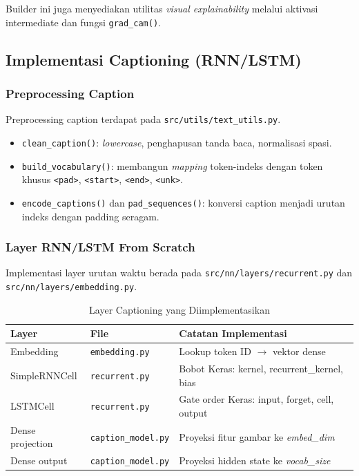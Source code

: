 Builder ini juga menyediakan utilitas \textit{visual explainability} melalui aktivasi intermediate dan fungsi \texttt{grad\_cam()}.

\subsection{Implementasi Captioning (RNN/LSTM)}

\subsubsection{Preprocessing Caption}
Preprocessing caption terdapat pada \texttt{src/utils/text\_utils.py}.

\begin{itemize}
    \item \texttt{clean\_caption()}: \textit{lowercase}, penghapusan tanda baca, normalisasi spasi.
    \item \texttt{build\_vocabulary()}: membangun \textit{mapping} token-indeks dengan token khusus \texttt{<pad>}, \texttt{<start>}, \texttt{<end>}, \texttt{<unk>}.
    \item \texttt{encode\_captions()} dan \texttt{pad\_sequences()}: konversi caption menjadi urutan indeks dengan padding seragam.
\end{itemize}

\subsubsection{Layer RNN/LSTM From Scratch}
Implementasi layer urutan waktu berada pada \texttt{src/nn/layers/recurrent.py} dan \texttt{src/nn/layers/embedding.py}.

\begin{table}[H]
    \centering
    \caption{Layer Captioning yang Diimplementasikan}
    \begin{tabular}{lll}
        \toprule
        \textbf{Layer} & \textbf{File} & \textbf{Catatan Implementasi} \\
        \midrule
        Embedding & \texttt{embedding.py} & Lookup token ID $\rightarrow$ vektor dense \\
        SimpleRNNCell & \texttt{recurrent.py} & Bobot Keras: kernel, recurrent\_kernel, bias \\
        LSTMCell & \texttt{recurrent.py} & Gate order Keras: input, forget, cell, output \\
        Dense projection & \texttt{caption\_model.py} & Proyeksi fitur gambar ke \textit{embed\_dim} \\
        Dense output & \texttt{caption\_model.py} & Proyeksi hidden state ke \textit{vocab\_size} \\
        \bottomrule
    \end{tabular}
    \label{tab:layer-caption-impl}
\end{table}

